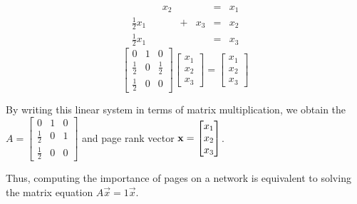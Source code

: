 \begin{applicationActivities}
\begin{observation}
\begin{multicols}{2}
\begin{center}
  \end{center}
  \columnbreak
  \begin{alignat*}{4}
    && x_2 && &=& x_1 \\
  \frac{1}{2} x_1&& &+&x_3 &=& x_2 \\
  \frac{1}{2} x_1&& && &=& x_3
  \end{alignat*}
  \[
    \begin{bmatrix}0&1&0\\\frac{1}{2}&0&\frac{1}{2}\\\frac{1}{2}&0&0\end{bmatrix}
    \begin{bmatrix}x_1\\x_2\\x_3\end{bmatrix}
  =
    \begin{bmatrix}x_1\\x_2\\x_3\end{bmatrix}
  \]
\end{multicols}

By writing this linear system in terms of matrix multiplication, we obtain the
\(
  A
    =
  \begin{bmatrix}
    0 & 1 & 0 \\
    \frac{1}{2} & 0 & 1 \\
    \frac{1}{2} & 0 & 0
  \end{bmatrix}
\) and page rank vector
\(\mathbf{x}=\begin{bmatrix} x_1 \\ x_2 \\ x_3 \end{bmatrix}\).

Thus, computing the importance of pages on a network is equivalent to solving
the matrix equation \(A\vec{x}=1\vec{x}\).

\end{observation}


\end{applicationActivities}

